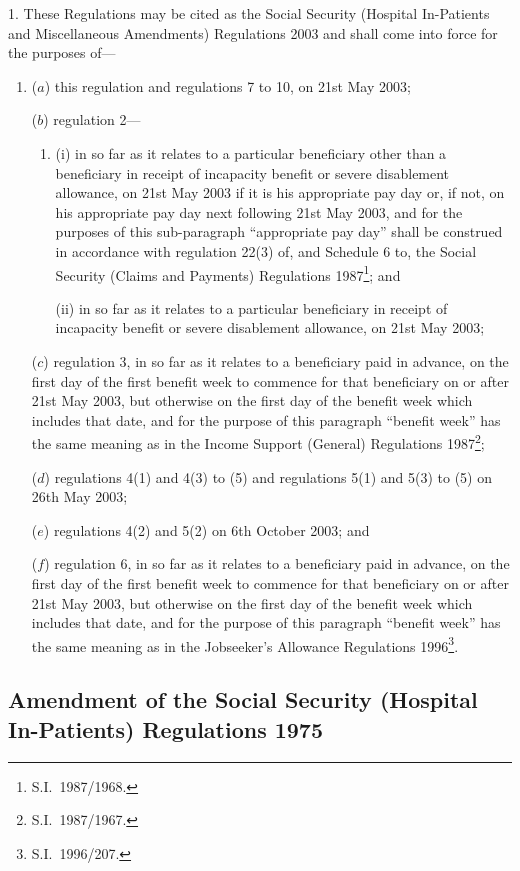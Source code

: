 \documentclass[12pt,a4paper]{article}
\begin{document}
1.  These Regulations may be cited as the Social Security (Hospital In-Patients and Miscellaneous Amendments) Regulations 2003 and shall come into force for the purposes of—
\begin{enumerate}\item[]
($a$) this regulation and regulations 7 to 10, on 21st May 2003;

($b$) regulation 2—
\begin{enumerate}\item[]
(i) in so far as it relates to a particular beneficiary other than a beneficiary in receipt of incapacity benefit or severe disablement allowance, on 21st May 2003 if it is his appropriate pay day or, if not, on his appropriate pay day next following 21st May 2003, and for the purposes of this sub-paragraph “appropriate pay day” shall be construed in accordance with regulation 22(3) of, and Schedule 6 to, the Social Security (Claims and Payments) Regulations 1987\footnote{S.I.\ 1987/1968.}; and

(ii) in so far as it relates to a particular beneficiary in receipt of incapacity benefit or severe disablement allowance, on 21st May 2003;
\end{enumerate}

($c$) regulation 3, in so far as it relates to a beneficiary paid in advance, on the first day of the first benefit week to commence for that beneficiary on or after 21st May 2003, but otherwise on the first day of the benefit week which includes that date, and for the purpose of this paragraph “benefit week” has the same meaning as in the Income Support (General) Regulations 1987\footnote{S.I.\ 1987/1967.};

($d$) regulations 4(1) and 4(3) to (5) and regulations 5(1) and 5(3) to (5) on 26th May 2003;

($e$) regulations 4(2) and 5(2) on 6th October 2003; and

($f$) regulation 6, in so far as it relates to a beneficiary paid in advance, on the first day of the first benefit week to commence for that beneficiary on or after 21st May 2003, but otherwise on the first day of the benefit week which includes that date, and for the purpose of this paragraph “benefit week” has the same meaning as in the Jobseeker’s Allowance Regulations 1996\footnote{S.I.\ 1996/207.}.
\end{enumerate}

\subsection[2. Amendment of the Social Security (Hospital In-Patients) Regulations 1975]{Amendment of the Social Security (Hospital In-Patients) Regulations 1975}
\end{document}
